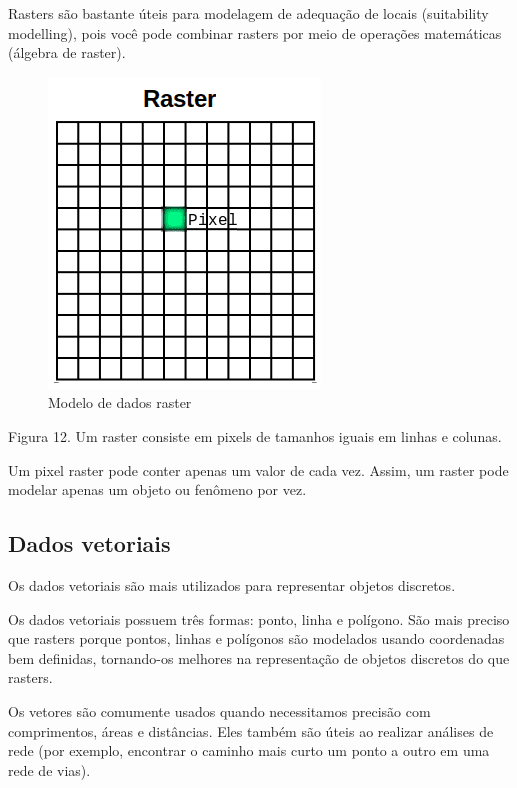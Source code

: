 \documentclass[
]{krantz}
\begin{document}
Rasters são bastante úteis para modelagem de adequação de locais (suitability modelling), pois você pode combinar rasters por meio de operações matemáticas (álgebra de raster).

\begin{figure}
\centering
\includegraphics{media/modulo0/raster.png}
\caption{Modelo de dados raster}
\end{figure}

Figura 12. Um raster consiste em pixels de tamanhos iguais em linhas e colunas.

Um pixel raster pode conter apenas um valor de cada vez. Assim, um raster pode modelar apenas um objeto ou fenômeno por vez.

\hypertarget{dados-vetoriais}{%
\subsection{Dados vetoriais}\label{dados-vetoriais}}

Os dados vetoriais são mais utilizados para representar objetos discretos.

Os dados vetoriais possuem três formas: ponto, linha e polígono. São mais preciso que rasters porque pontos, linhas e polígonos são modelados usando coordenadas bem definidas, tornando-os melhores na representação de objetos discretos do que rasters.

Os vetores são comumente usados quando necessitamos precisão com comprimentos, áreas e distâncias. Eles também são úteis ao realizar análises de rede (por exemplo, encontrar o caminho mais curto um ponto a outro em uma rede de vias).
\end{document}
